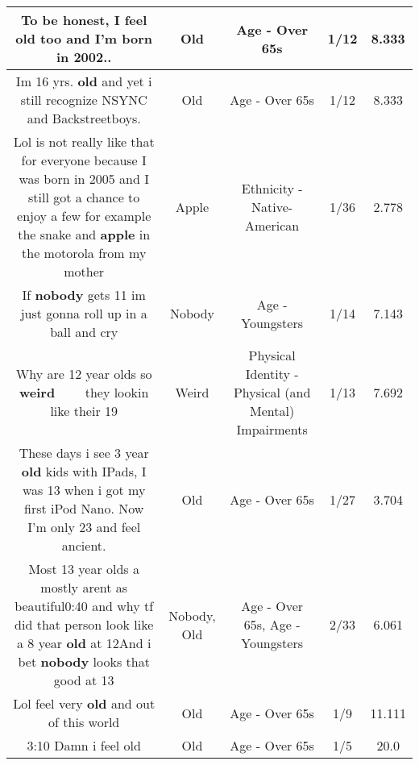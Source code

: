 \documentclass[11pt]{article}
\newlength\mylength
\begin{document}
\begin{center}
\begin{longtable}{|C{.65\mylength}|C{.30\mylength}|C{.12\mylength}|C{.12\mylength}|C{.12\mylength}|}
  \small To be honest, I feel \textbf{old} too and I'm born in 2002..\normalsize   & Old & Age - Over 65s & 1/12 & 8.333 \\  \hline
  \small Im 16 yrs. \textbf{old} and yet i still recognize NSYNC and Backstreetboys.\normalsize   & Old & Age - Over 65s & 1/12 & 8.333 \\  \hline
  \small Lol is not really like that for everyone because I was born in 2005 and I still got a chance to enjoy a few for example the snake and \textbf{apple} in the motorola from my mother\normalsize   & Apple & Ethnicity - Native-American & 1/36 & 2.778 \\  \hline
  \small If \textbf{nobody} gets 11 im just gonna roll up in a ball and cry\normalsize   & Nobody & Age - Youngsters & 1/14 & 7.143 \\  \hline
  \small Why are 12 year olds so \textbf{weird} 🤷🏻‍♀️🤷🏻‍♀️ they lookin like their 19\normalsize   & Weird & Physical Identity - Physical (and Mental) Impairments & 1/13 & 7.692 \\  \hline
  \small These days i see 3 year \textbf{old} kids with IPads, I was 13 when i got my first iPod Nano. Now I'm only 23 and feel ancient.\normalsize   & Old & Age - Over 65s & 1/27 & 3.704 \\  \hline
  \small Most 13 year olds a mostly arent as beautiful0:40 and why tf did that person look like a 8 year \textbf{old} at 12And i bet \textbf{nobody} looks that good at 13\normalsize   & Nobody, Old & Age - Over 65s, Age - Youngsters & 2/33 & 6.061 \\  \hline
  \small Lol feel very \textbf{old} and out of this world\normalsize   & Old & Age - Over 65s & 1/9 & 11.111 \\  \hline
  \small 3:10 Damn i feel old\normalsize   & Old & Age - Over 65s & 1/5 & 20.0 \\  \hline

\end{longtable}
\end{center}
\end{document}
